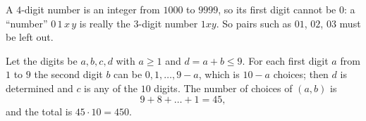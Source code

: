 A $4$-digit number is an integer from $1000$ to $9999$, so its first digit cannot be $0$: a ``number'' $0\,1\,x\,y$ is really the $3$-digit number $1xy$. So pairs such as $01$, $02$, $03$ must be left out.

Let the digits be $a,b,c,d$ with $a\ge1$ and $d=a+b\le9$. For each first digit $a$ from $1$ to $9$ the second digit $b$ can be $0,1,\dots,9-a$, which is $10-a$ choices; then $d$ is determined and $c$ is any of the $10$ digits. The number of choices of $(a,b)$ is
\[
9+8+\dots+1=45,
\]
and the total is $45\cdot10=\boxed{450}$.
